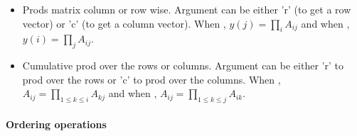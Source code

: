 \begin{itemize}
\item {}
  \sshortdescribe Prods matrix column or row wise. Argument  can be
  either 'r' (to get a row vector) or 'c' (to get a column vector). When
  , $y(j) = \prod_i A_{ij}$ and when , $y(i) = \prod_j
  A_{ij}$.

\item {} 
  \sshortdescribe Cumulative prod over the rows or columns. Argument 
  can be either 'r' to prod over the rows or 'c' to prod over the columns. When
  , $A_{ij} = \prod_{1 \le k \le i} A_{kj}$ and when , 
  $A_{ij} = \prod_{1 \le k \le j} A_{ik}$.
\end{itemize}

\paragraph{Ordering operations}


